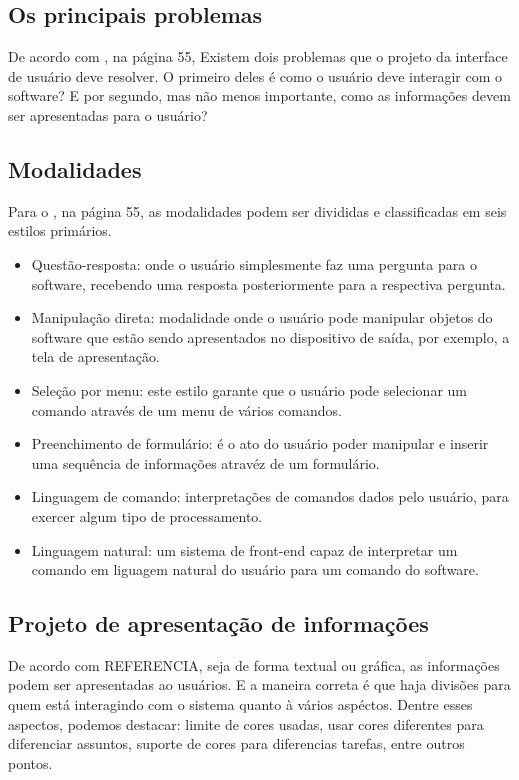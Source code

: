 \subsection[Os principais problemas]{Os principais problemas}
De acordo com \cite{swebok}, na página 55, Existem dois problemas que o projeto da interface de usuário deve resolver. O
primeiro deles é como o usuário deve interagir com o software? E por segundo, mas
não menos importante, como as informações devem ser apresentadas para o usuário?

\subsection[Modalidade]{Modalidades}
Para o \cite{swebok}, na página 55, as modalidades podem ser divididas e classificadas em seis estilos primários.

\begin{itemize}
    \item Questão-resposta: onde o usuário simplesmente faz uma pergunta para o
        software, recebendo uma resposta posteriormente para a respectiva pergunta.

    \item Manipulação direta: modalidade onde o usuário pode manipular objetos
        do software que estão sendo apresentados no dispositivo de saída, por
        exemplo, a tela de apresentação.

    \item Seleção por menu: este estilo garante que o usuário pode selecionar um
        comando através de um menu de vários comandos.

    \item Preenchimento de formulário: é o ato do usuário poder manipular e inserir
        uma sequência de informações atravéz de um formulário.

    \item Linguagem de comando: interpretações de comandos dados pelo usuário,
        para exercer algum tipo de processamento.

    \item Linguagem natural: um sistema de front-end capaz de interpretar um
        comando em liguagem natural do usuário para um comando do software.
\end{itemize}

\subsection[Projeto de apresentação de informações]{Projeto de apresentação de informações}
De acordo com REFERENCIA, seja de forma textual ou gráfica, as informações podem
ser apresentadas ao usuários. E a maneira correta é que haja divisões para quem
está interagindo com o sistema quanto à vários aspéctos. Dentre esses aspectos,
podemos destacar: limite de cores usadas, usar cores diferentes para diferenciar
assuntos, suporte de cores para diferencias tarefas, entre outros pontos.
